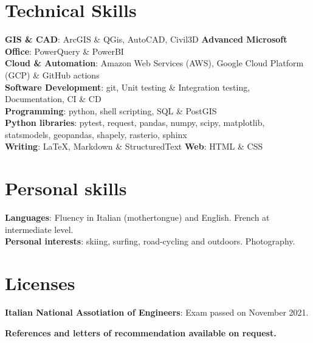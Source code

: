 \documentclass[letterpaper,11pt]{article}
\begin{document}
\section{Technical Skills}
 \begin{itemize}[leftmargin=0.15in, label={}]
    \small{\item{
     \textbf{GIS \& CAD}{: ArcGIS \& QGis, AutoCAD, Civil3D} \textbf{Advanced Microsoft Office}{: PowerQuery \& PowerBI} \\
     \textbf{Cloud \& Automation}{: Amazon Web Services (AWS), Google Cloud Platform (GCP) \& GitHub actions}\\
     \textbf{Software Development}{: git, Unit testing \& Integration testing, Documentation, CI \& CD}\\
     \textbf{Programming}{: python, shell scripting, SQL \& PostGIS}\\
     \textbf{Python libraries}{: pytest, request, pandas, numpy, scipy, matplotlib, statsmodels, geopandas, shapely, rasterio, sphinx}\\
     \textbf{Writing}{: \LaTeX\:, Markdown \& StructuredText}     \textbf{Web}{: HTML \& CSS}\\


}}
 \end{itemize}


\section{Personal skills}
 \begin{itemize}[leftmargin=0.15in, label={}]
    \small{\item{
     \textbf{Languages}{: Fluency in Italian (mothertongue) and English. French at intermediate level.} \\
     \textbf{Personal interests}{: skiing, surfing, road-cycling and outdoors. Photography.}\\
}}
 \end{itemize}

\section{Licenses}
 \begin{itemize}[leftmargin=0.15in, label={}]
    \small{\item{
     \textbf{Italian National Assotiation of Engineers}{: Exam passed on November 2021.} \\}}
 \end{itemize}

\centering
\textbf{References and letters of recommendation available on request.}

\end{document}
